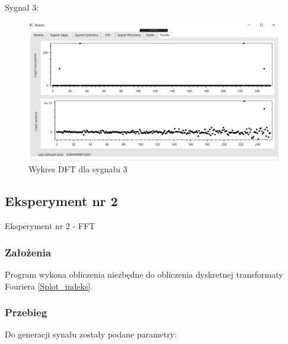 \documentclass[12pt]{article}
\begin{document}
\newpage
Sygnał 3:
\begin{figure}[h!]
 \centering
 \includegraphics[width=12.3cm]{s18F.PNG}
 \vspace{-0.3cm}
 \caption{Wykres DFT dla sygnału 3}
 \label{Wykres dla wynikw eksperymentu pierwszego}
\end{figure}


\subsection{Eksperyment nr 2}
Eksperyment nr 2  - FFT
\subsubsection{Założenia}
Program wykona obliczenia niezbędne do obliczenia dyskretnej transformaty Fouriera \ref{Splot_indeks}.

\subsubsection{Przebieg}
Do generacji synału zostały podane parametry:
\end{document}
